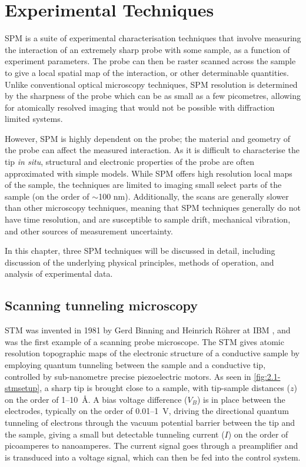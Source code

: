 
\chapter{Experimental Techniques}
\label{ch:exptech}

\Acf{SPM} is a suite of experimental characterisation techniques that involve measuring the interaction of an extremely sharp probe with some sample, as a function of experiment parameters. The probe can then be raster scanned across the sample to give a local spatial map of the interaction, or other determinable quantities. Unlike conventional optical microscopy techniques, \ac{SPM} resolution is determined by the sharpness of the probe which can be as small as a few picometres, allowing for atomically resolved imaging that would not be possible with diffraction limited systems. 

However, \ac{SPM} is highly dependent on the probe; the material and geometry of the probe can affect the measured interaction. As it is difficult to characterise the tip \textit{in situ}, structural and electronic properties of the probe are often approximated with simple models. While \ac{SPM} offers high resolution local maps of the sample, the techniques are limited to imaging small select parts of the sample (on the order of $\sim$100 nm). Additionally, the scans are generally slower than other microscopy techniques, meaning that \ac{SPM} techniques generally do not have time resolution, and are susceptible to sample drift, mechanical vibration, and other sources of measurement uncertainty.

In this chapter, three \ac{SPM} techniques will be discussed in detail, including discussion of the underlying physical principles, methods of operation, and analysis of experimental data.



\section{Scanning tunneling microscopy}

\Acf{STM} was invented in 1981 by Gerd Binning and Heinrich R\"ohrer at IBM \citep{binnig1982surface}, and was the first example of a scanning probe microscope. The \ac{STM} gives atomic resolution topographic maps of the electronic structure of a conductive sample by employing quantum tunneling between the sample and a conductive tip, controlled by sub-nanometre precise piezoelectric motors. As seen in \autoref{fig:2.1-stmsetup}, a sharp tip is brought close to a sample, with tip-sample distances ($z$) on the order of 1--\SI{10}{\angstrom}. A bias voltage difference ($V_B$) is in place between the electrodes, typically on the order of 0.01--\SI{1}{\volt}, driving the directional quantum tunneling of electrons through the vacuum potential barrier between the tip and the sample, giving a small but detectable tunneling current ($I$) on the order of picoamperes to nanoamperes. The current signal goes through a preamplifier and is transduced into a voltage signal, which can then be fed into the control system.

